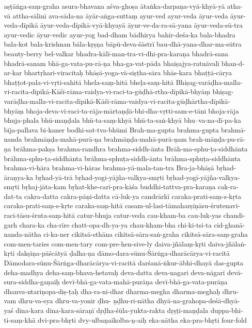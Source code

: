 {aṣṭāṅga-saṃ-graha
asura-bhavana
aśva-ghoṣa
ātaṅka-darpaṇa-vyā-khyā-yā
atha-vā
attha-sālinī
ava-sāda-na
āyār-aṅga-suttaṃ
ayur-ved
ayur-veda
āyur-veda
āyur-veda-dīpikā
āyur-veda-dīpikā-vyā-khyayā
āyur-ve-da-ra-sā-yana
āyur-veda-sū-tra
ayur-vedic
āyur-vedic
ayur-yog
bad-dham
bādhirya
bahir-deśa-ka
bala-bhadra
bala-kot
bala-krishnan
bāla-kṛṣṇa
bāpū-deva-śāstrī
bau-dhā-yana-dhar-ma-sūtra
beauty-berry
bel-valkar
bhadra-kālī-man-tra-vi-dhi-pra-karaṇa
bhadrā-sana
bhadrā-sanam
bhā-ga-vata-pu-rā-ṇa
bha-ga-vat-pāda
bhaiṣajya-ratnāvalī
bhan-d-ar-kar
bhartṛhari-viracitaḥ
bhāṣā-yoga-vā-siṣṭha-sāra
bhās-kara
bhaṭṭā-cārya
bhaṭṭot-pala-vi-vṛti-sahitā
bhela-saṃ-hitā
bheḷa-saṃ-hitā
Bhiṣag-varāḍha-malla-vi-racita-dīpikā-Kāśī-rāma-vaidya-vi-raci-ta-gūḍhā-rtha-dīpikā-bhyāṃ
bhiṣag-varāḍha-malla-vi-racita-dīpikā-Kāśī-rāma-vaidya-vi-racita-gūḍhārtha-dīpikā-bhyāṃ
bhoja-deva-vi-raci-ta-rāja-mārtaṇḍā-bhi-dha-vṛtti-sam-e-tāni
bhoja-rāja
bhuja-phala
bhū-maṇḍala
bhū-ta-saṃ-khyā
bhū-ta-saṅ-khyā
bhu--va-na-dī-pa-ka
bīja-pallava
bi-kaner
bodhi-sat-tva-bhūmi
Brah-ma-gupta
brahma-gupta
brahmā-nanda
brahmāṇḍa-mahā-purā-ṇa
brahmāṇḍa-mahā-purā-ṇam
brah-māṇḍa-pu-rā-ṇa
brāhma-pakṣa
brahma-randhra
brahma-siddh-ānta
Brāh-ma-sphu-ṭa-siddhānta
brāhma-sphu-ṭa-siddhānta
brāhma-sphuṭa-siddh-ānta
brāhma-sphuṭa-siddhānta
brahma-vi-hāra
brahma-vi-hāras
brahma-yā-mala-tan-tra
Bra-ja-bhāṣā
bṛhad-āraṇya-ka
bṛhad-yā-trā
bṛhad-yogi-yājña-valkya-smṛti
bṛhad-yogī-yājña-valkya-smṛti
bṛhaj-jāta-kam
bṛhat-khe-carī-pra-kāśa
buddhi-tattva-pra-karaṇa
cak-ra-dat-ta
cakra-datta
cakra-pāṇi-datta
cā-luk-ya
candrārkī
caraka-prati-saṃ-s-kṛta
caraka-prati-saṃ-s-kṛte
caraka-saṃ-hitā
casam-ul-lasi-tāmaharṣiṇāsu-śrutenavi-raci-tāsu-śruta-saṃ-hitā
catur-bhuja
catur-veda
cau-kham-ba
cau-luk-yas
chandi-garh
chara-ka
cha-rīre
chatt-opa-dh-ya-ya
chau-kham-bha
chi-ki-tsi-ta
cid-ghanā-nanda-nātha
ci-ka-ner
cikitsā-sthāna
cikitsā-sāra-saṅ-graha cikitsā-sāra-saṃ-graha
com-men-taries
com-men-tary
com-pre-hen-sive-ly
daiva-jñālaṃ-kṛti
daiva-jñālaṅ-kṛti
dakṣiṇa-pāścātyā
ḍalha-ṇa
dāmo-dara-sūnu-Śārṅga-dharācārya-vi-racitā
Dāmodara-sūnu-Śārṅga-dharācārya-vi-racitā
darśanā-ṅkur-ābhi-dhayā
das-gupta
deha-madhya
deha-saṃ-bhava-hetavaḥ
deva-datta
deva-nagari
deva-nāgarī
devā-sura-siddha-gaṇaiḥ
devī-bhā-ga-vata-mahā-purāṇa
devī-bhā-ga-vata-purāṇa
dhanva-ntariṇopa-diṣ-ṭaḥ
dha-ra-ni-dhar
dharma-megha
dharma-meghaḥ
dhru-vam
dhru-va-sya
dhru-va-yonir
ḍhu- ṇḍhu-ri-nātha
dhyā-na-grahopa-deśā-dhyā-yaś
dina-kara
dina-kara-sāraṇī
dṛḍha-śūla-yukta-rakta
dṛṣṭi-maṇḍala
duppa-bhi-ti-saṃ-khā
dvi-pra-bhṛti
dvy-ulbaṇaikolba-ṇ-aiḥ
eka-nātha
eka-pra-bhṛti
four-fold
}
